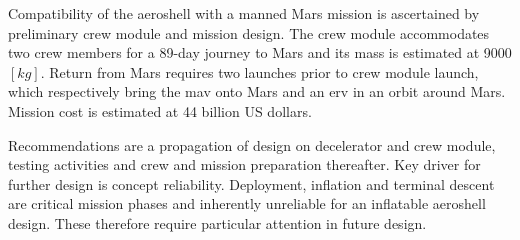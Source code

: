 Compatibility of the aeroshell with a manned Mars mission is ascertained by preliminary crew module and mission design. The crew module accommodates two crew members for a 89-day journey to Mars and its mass is estimated at 9000 $ \left[ kg \right] $. Return from Mars requires two launches prior to crew module launch, which respectively bring the \acrlong{mav} onto Mars and an \acrlong{erv} in an orbit around Mars. Mission cost is estimated at 44 billion US dollars.

Recommendations are a propagation of design on decelerator and crew module, testing activities and crew and mission preparation thereafter. Key driver for further design is concept reliability. Deployment, inflation and terminal descent are critical mission phases and inherently unreliable for an inflatable aeroshell design. These therefore require particular attention in future design.


